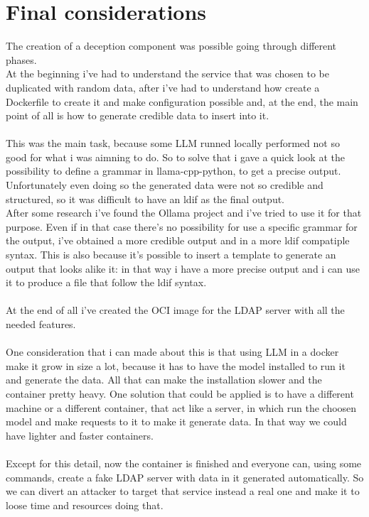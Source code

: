 \chapter{Final considerations}
The creation of a deception component was possible going through different phases.
\\
At the beginning i've had to understand the service that was chosen to be duplicated with random data, after i've had to understand how create a Dockerfile to create it and make configuration possible and, at the end, the main point of all is how to generate credible data to insert into it.
\\\\
This was the main task, because some LLM runned locally performed not so good for what i was aimning to do. So to solve that i gave a quick look at the possibility to define a grammar in llama-cpp-python, to get a precise output. Unfortunately even doing so the generated data were not so credible and structured, so it was difficult to have an ldif as the final output.
\\
After some research i've found the Ollama project and i've tried to use it for that purpose. Even if in that case there's no possibility for use a specific grammar for the output, i've obtained a more credible output and in a more ldif compatiple syntax. This is also because it's possible to insert a template to generate an output that looks alike it: in that way i have a more precise output and i can use it to produce a file that follow the ldif syntax.
\\\\
At the end of all i've created the OCI image for the LDAP server with all the needed features.
\\\\
One consideration that i can made about this is that using LLM in a docker make it grow in size a lot, because it has to have the model installed to run it and generate the data. All that can make the installation slower and the container pretty heavy. One solution that could be applied is to have a different machine or a different container, that act like a server, in which run the choosen model and make requests to it to make it generate data. In that way we could have lighter and faster containers.
\\\\
Except for this detail, now the container is finished and everyone can, using some commands, create a fake LDAP server with data in it generated automatically. So we can divert an attacker to target that service instead a real one and make it to loose time and resources doing that.

